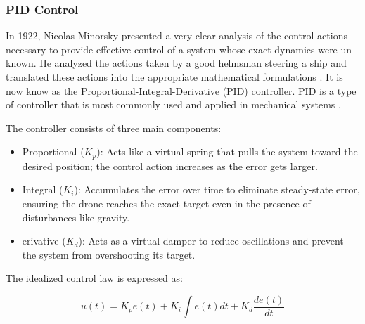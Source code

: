
\subsubsection{PID Control}


In 1922, Nicolas Minorsky presented a very clear analysis of the control actions necessary to provide effective control of a system whose exact dynamics were un- known. He analyzed the actions taken by a good helmsman steering a ship and translated these actions into the appropriate mathematical formulations \parencite{bennett1993pid}. It is now know as the Proportional-Integral-Derivative (PID) controller. PID is a type of controller that is most commonly used and applied in mechanical systems \parencite{idrissi_review_2022}.

The controller consists of three main components:

\begin{itemize}
    \item Proportional ($K_p$): Acts like a virtual spring that pulls the system toward the desired position; the control action increases as the error gets larger.
    \item Integral ($K_i$): Accumulates the error over time to eliminate steady-state error, ensuring the drone reaches the exact target even in the presence of disturbances like gravity.
    \item erivative ($K_d$): Acts as a virtual damper to reduce oscillations and prevent the system from overshooting its target.
\end{itemize}

The idealized control law is expressed as:

$$u(t) = K_p e(t) + K_i \int e(t) dt + K_d \frac{de(t)}{dt}$$
